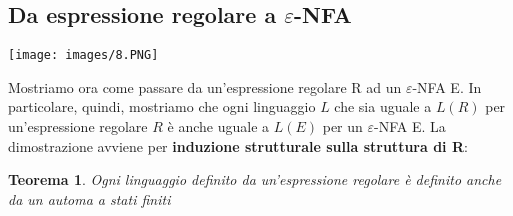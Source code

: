 \documentclass[12pt]{article}
\newtheorem{Teorema}{Teorema}[subsection]
\begin{document}
\subsection{Da espressione regolare a \textbf{$\varepsilon$}-NFA}
\begin{center}
    \texttt{[image: images/8.PNG]}
\end{center}
Mostriamo ora come passare da un'espressione regolare R ad un $\varepsilon$-NFA E. In particolare, quindi, mostriamo che ogni linguaggio $L$ che sia uguale a $L(R)$ per un'espressione regolare $R$ è anche uguale a $L(E)$ per un $\varepsilon$-NFA E. La dimostrazione avviene per \textbf{induzione strutturale sulla struttura di R}:

\begin{Teorema}
Ogni linguaggio definito da un'espressione regolare è definito anche da un automa a stati finiti
\end{Teorema}
\end{document}
